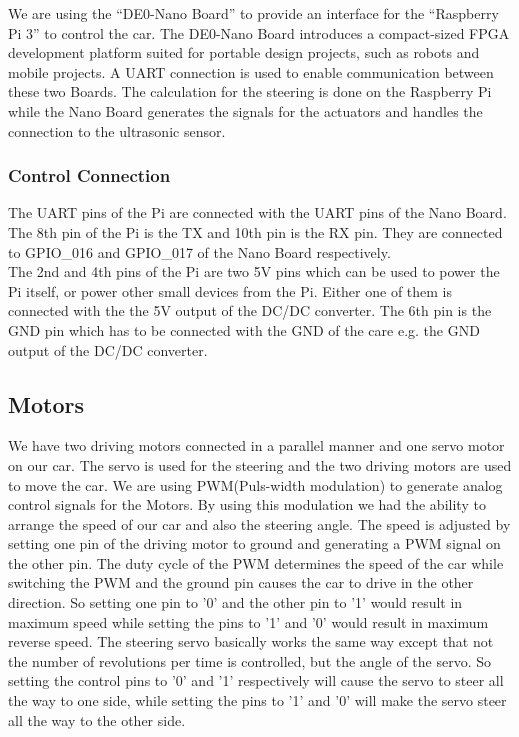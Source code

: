 \documentclass[11pt,twocolumn]{article}
\begin{document}
We are using the “DE0-Nano Board” to provide an interface for the “Raspberry Pi 3” to control the car. The DE0-Nano Board introduces a compact-sized FPGA development platform suited for portable design projects, such as robots and mobile projects. A UART connection is used to enable communication between these two Boards. The calculation for the steering is done on the Raspberry Pi while the Nano Board generates the signals for the actuators and handles the connection to the ultrasonic sensor.

\subsubsection{Control Connection}
The UART pins of the Pi are connected with the UART pins of the Nano Board. The 8th pin of the Pi is the TX and 10th pin is the RX pin. They are connected to GPIO\_016 and GPIO\_017 of the Nano Board respectively.\\
The 2nd and 4th pins of the Pi are two 5V pins which can be used to power the Pi itself, or power other small devices from the Pi. Either one of them is connected with the the 5V output of the DC/DC converter. The 6th pin is the GND pin which has to be connected with the GND of the care e.g. the GND output of the DC/DC converter.

\subsection{Motors}

We have two driving motors connected in a parallel manner and one servo motor on our car. The servo is used for the steering and the two driving motors are used to move the car. We are using PWM(Puls-width modulation) to generate analog control signals for the Motors. By using this modulation we had the ability to arrange the speed of our car and also the steering angle. The speed is adjusted by setting one pin of the driving motor to ground and generating a PWM signal on the other pin. The duty cycle of the PWM determines the speed of the car while switching the PWM and the ground pin causes the car to drive in the other direction. So setting one pin to '0' and the other pin to '1' would result in maximum speed while setting the pins to '1' and '0' would result in maximum reverse speed. The steering servo basically works the same way except that not the number of revolutions per time is controlled, but the angle of the servo. So setting the control pins to '0' and '1' respectively will cause the servo to steer all the way to one side, while setting the pins to '1' and '0' will make the servo steer all the way to the other side. 
\end{document}
